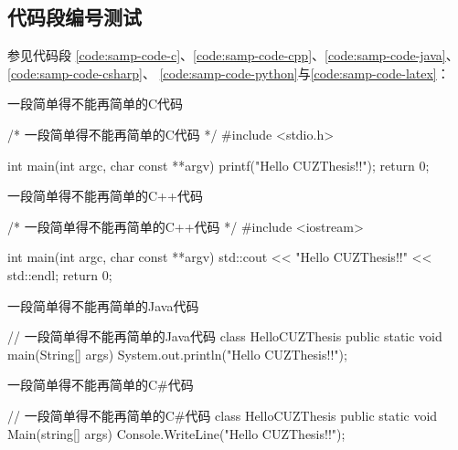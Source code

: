 \begin{appendices}
    \subsection{代码段编号测试} \label{subsec:testlistings}

    参见代码段
    \ref{code:samp-code-c}、\ref{code:samp-code-cpp}、\ref{code:samp-code-java}、\ref{code:samp-code-csharp}、
    \ref{code:samp-code-python}与\ref{code:samp-code-latex}：

    \begin{listing}[H]
        \centering
        \caption{一段简单得不能再简单的C代码}
        \label{code:samp-code-c}
        \begin{ccode}
            /* 一段简单得不能再简单的C代码 */
            #include <stdio.h>

            int main(int argc, char const **argv) {
                printf("Hello CUZThesis!!\n");
                return 0;
            }
        \end{ccode}
    \end{listing}

    \begin{listing}[H]
        \centering
        \caption{一段简单得不能再简单的C++代码}
        \label{code:samp-code-cpp}
        \begin{cppcode}
            /* 一段简单得不能再简单的C++代码 */
            #include <iostream>

            int main(int argc, char const **argv) {
                std::cout << "Hello CUZThesis!!" << std::endl;
                return 0;
            }
        \end{cppcode}
    \end{listing}

    \begin{listing}[H]
        \centering
        \caption{一段简单得不能再简单的Java代码}
        \label{code:samp-code-java}
        \begin{javacode}
            // 一段简单得不能再简单的Java代码
            class HelloCUZThesis {
                public static void main(String[] args) {
                    System.out.println("Hello CUZThesis!!");
                }
            }
        \end{javacode}
    \end{listing}

    \begin{listing}[H]
        \centering
        \caption{一段简单得不能再简单的C\#代码}
        \label{code:samp-code-csharp}
        \begin{csharpcode}
            // 一段简单得不能再简单的C#代码
            class HelloCUZThesis {
                public static void Main(string[] args) {
                    Console.WriteLine("Hello CUZThesis!!");
                }
            }
        \end{csharpcode}
    \end{listing}


\end{appendices}
